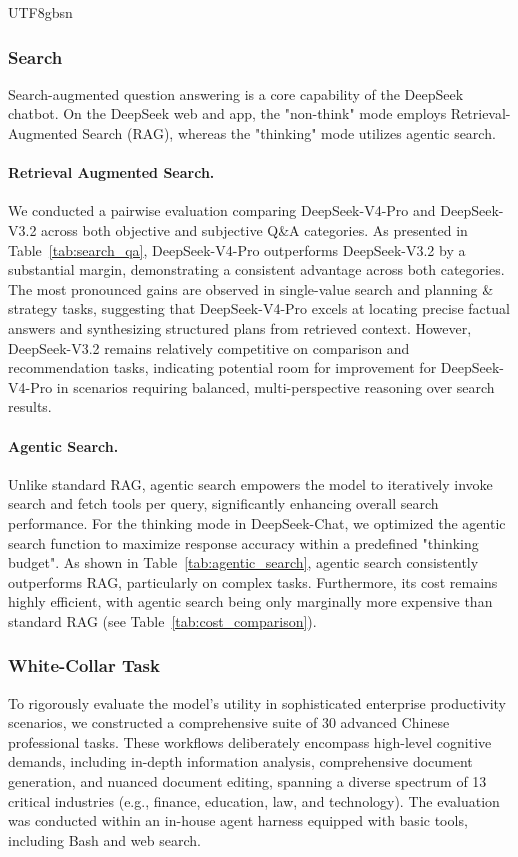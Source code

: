 \documentclass[11pt, a4paper, logo, copyright, nonumbering]{deepseek}
\newcommand{\dsviiiII}{DeepSeek-V3.2}
\newcommand{\dsvivp}{DeepSeek-V4-Pro}
\begin{document}
\begin{CJK*}{UTF8}{gbsn}
\subsubsection{Search}

Search-augmented question answering is a core capability of the DeepSeek chatbot. 
On the DeepSeek web and app, the "non-think" mode employs Retrieval-Augmented Search (RAG), whereas the "thinking" mode utilizes agentic search.  

\paragraph{Retrieval Augmented Search.}
We conducted a pairwise evaluation comparing \dsvivp{} and \dsviiiII{} across both objective and subjective Q\&A categories. 
As presented in Table~\ref{tab:search_qa}, \dsvivp{} outperforms \dsviiiII{} by a substantial margin, demonstrating a consistent advantage across both categories. 
The most pronounced gains are observed in single-value search and planning \& strategy tasks, suggesting that \dsvivp{} excels at locating precise factual answers and synthesizing structured plans from retrieved context. 
However, \dsviiiII{} remains relatively competitive on comparison and recommendation tasks, indicating potential room for improvement for \dsvivp{} in scenarios requiring balanced, multi-perspective reasoning over search results.

\paragraph{Agentic Search.}
Unlike standard RAG, agentic search empowers the model to iteratively invoke search and fetch tools per query, significantly enhancing overall search performance. 
For the thinking mode in DeepSeek-Chat, we optimized the agentic search function to maximize response accuracy within a predefined "thinking budget". 
As shown in Table~\ref{tab:agentic_search}, agentic search consistently outperforms RAG, particularly on complex tasks. 
Furthermore, its cost remains highly efficient, with agentic search being only marginally more expensive than standard RAG (see Table~\ref{tab:cost_comparison}).

\subsubsection{White-Collar Task}

To rigorously evaluate the model's utility in sophisticated enterprise productivity scenarios, we constructed a comprehensive suite of 30 advanced Chinese professional tasks. 
These workflows deliberately encompass high-level cognitive demands, including in-depth information analysis, comprehensive document generation, and nuanced document editing, spanning a diverse spectrum of 13 critical industries (e.g., finance, education, law, and technology). 
The evaluation was conducted within an in-house agent harness equipped with basic tools, including Bash and web search. 


\end{CJK*}
\end{document}
